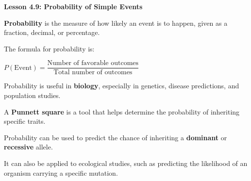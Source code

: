  \begin{center}
\textbf{Lesson 4.9: Probability of Simple Events}
\end{center}

\vspace*{-1ex}

\noindent\textbf{Probability} is the measure of how likely an event is to happen, given as a fraction, decimal, or percentage.

    \noindent The formula for probability is:

{\centering $ P(\text{Event}) = \dfrac{\text{Number of favorable outcomes}}{\text{Total number of outcomes}} $\par}
    \noindent Probability is useful in \textbf{biology}, especially in genetics, disease predictions, and population studies.
    
    \noindent A \textbf{Punnett square} is a tool that helps determine the probability of inheriting specific traits.
    
    \noindent Probability can be used to predict the chance of inheriting a \textbf{dominant} or \textbf{recessive} allele.
    
    \noindent It can also be applied to ecological studies, such as predicting the likelihood of an organism carrying a specific mutation.



